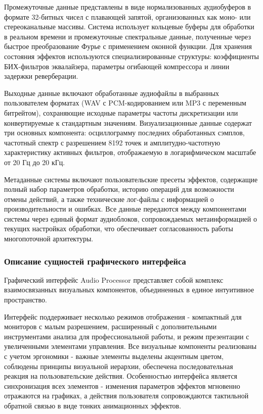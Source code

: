 Промежуточные данные представлены в виде нормализованных аудиобуферов в формате 32-битных чисел с плавающей запятой, организованных как моно- или стереоканальные массивы. Система использует кольцевые буферы для обработки в реальном времени и промежуточные спектральные данные, полученные через быстрое преобразование Фурье с применением оконной функции. Для хранения состояния эффектов используются специализированные структуры: коэффициенты БИХ-фильтров эквалайзера, параметры огибающей компрессора и линии задержки реверберации.

Выходные данные включают обработанные аудиофайлы в выбранных пользователем форматах (WAV с PCM-кодированием или MP3 с переменным битрейтом), сохраняющие исходные параметры частоты дискретизации или конвертируемые к стандартным значениям. Визуализационные данные содержат три основных компонента: осциллограмму последних обработанных сэмплов, частотный спектр с разрешением 8192 точек и амплитудно-частотную характеристику активных фильтров, отображаемую в логарифмическом масштабе от 20 Гц до 20 кГц.

Метаданные системы включают пользовательские пресеты эффектов, содержащие полный набор параметров обработки, историю операций для возможности отмены действий, а также технические лог-файлы с информацией о производительности и ошибках. Все данные передаются между компонентами системы через единый формат аудиоблоков, сопровождаемых метаинформацией о текущих настройках обработки, что обеспечивает согласованность работы многопоточной архитектуры.

\subsubsection{Описание сущностей графического интерфейса}

Графический интерфейс Audio Processor представляет собой комплекс взаимосвязанных визуальных компонентов, объединенных в единое интуитивное пространство. 

Интерфейс поддерживает несколько режимов отображения - компактный для мониторов с малым разрешением, расширенный с дополнительными инструментами анализа для профессиональной работы, и режим презентации с увеличенными элементами управления. Все визуальные компоненты реализованы с учетом эргономики - важные элементы выделены акцентным цветом, соблюдены принципы визуальной иерархии, обеспечена последовательная реакция на пользовательские действия. Особенностью интерфейса является синхронизация всех элементов - изменения параметров эффектов мгновенно отражаются на графиках, а действия пользователя сопровождаются тактильной обратной связью в виде тонких анимационных эффектов.

